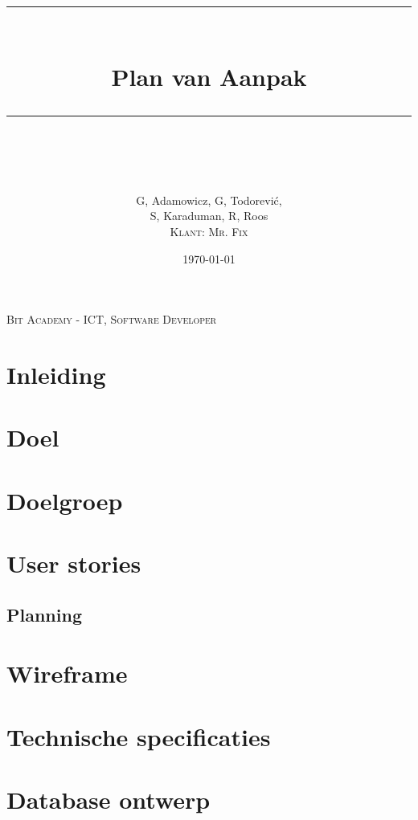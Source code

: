 \documentclass[dutch,11pt]{article}
\begin{document}
\begin{titlepage}

\author{
    \LARGE G, Adamowicz, G, Todorević, \\
	\LARGE S, Karaduman, R, Roos \\ 
    \textsc{\small Klant: Mr. Fix} \\
}

\title{
	\vspace{80pt}
	\rule{\linewidth}{0.7pt}\\
	\vspace{7pt}
	\huge{Plan van Aanpak}\\
	\rule{\linewidth}{0.8pt}\\
	\vspace{30pt}
}

\date{\small \today}

\maketitle

\vspace{\fill}
\normalfont\small
\centering
\textsc{Bit Academy - ICT, Software Developer}\\
\vspace{10pt}

\thispagestyle{empty} %
\end{titlepage}

\tableofcontents

\section{Inleiding}
\section{Doel}
\section{Doelgroep}
\section{User stories}
\subsection{Planning}
\section{Wireframe}
\section{Technische specificaties}
\section{Database ontwerp}

\newpage

\printbibliography[heading=bibintoc,title={Bronvermelding}]
\end{document}

